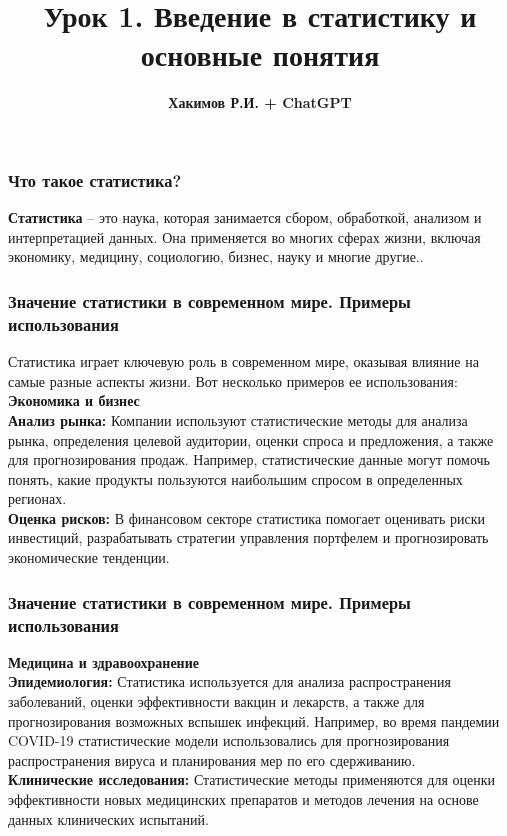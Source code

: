\documentclass[aspectratio=169]{beamer}
\title{\bf Урок 1. Введение в статистику и основные понятия}
\author{{\bf Хакимов Р.И. + ChatGPT}}
\date[\today]{}
\begin{document}
\begin{frame}
\titlepage
\end{frame}

\begin{frame}
\frametitle{Что такое статистика?}
\textbf{Статистика} -- это наука, которая занимается сбором, обработкой, анализом и интерпретацией данных. Она применяется во многих сферах жизни, включая экономику, медицину, социологию, бизнес, науку и многие другие..
\end{frame}

\begin{frame}
\frametitle{Значение статистики в современном мире. Примеры использования}
Статистика играет ключевую роль в современном мире, оказывая влияние на самые разные аспекты жизни. Вот несколько примеров ее использования:
\newline\\
\textbf{Экономика и бизнес}
\newline\\
\textbf{Анализ рынка:} Компании используют статистические методы для анализа рынка, определения целевой аудитории, оценки спроса и предложения, а также для прогнозирования продаж. Например, статистические данные могут помочь понять, какие продукты пользуются наибольшим спросом в определенных регионах.
\newline\\
\textbf{Оценка рисков:} В финансовом секторе статистика помогает оценивать риски инвестиций, разрабатывать стратегии управления портфелем и прогнозировать экономические тенденции.
\end{frame}

\begin{frame}
\frametitle{Значение статистики в современном мире. Примеры использования}
\textbf{Медицина и здравоохранение}
\newline\\
\textbf{Эпидемиология:} Статистика используется для анализа распространения заболеваний, оценки эффективности вакцин и лекарств, а также для прогнозирования возможных вспышек инфекций. Например, во время пандемии COVID-19 статистические модели использовались для прогнозирования распространения вируса и планирования мер по его сдерживанию.
\newline\\
\textbf{Клинические исследования:} Статистические методы применяются для оценки эффективности новых медицинских препаратов и методов лечения на основе данных клинических испытаний.
\end{frame}
\end{document}
